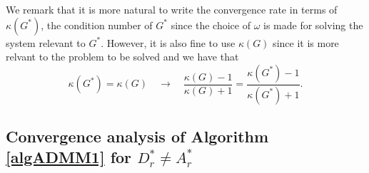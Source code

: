 \begin{remark}
We remark that it is more natural to write the convergence rate in terms of $\kappa(G^*)$, the condition number of $G^*$ since the choice of $\omega$ is made for solving the system relevant to $G^*$. However, it is also fine to use $\kappa(G)$ since it is more relvant to the problem to be solved and we have that
\begin{equation}
\kappa(G^*) = \kappa(G) \quad \rightarrow \quad 
\frac{\kappa(G) - 1}{\kappa(G) + 1} = \frac{\kappa(G^*) - 1}{\kappa(G^*) + 1}. 
\end{equation}
\end{remark} 

\subsection{Convergence analysis of Algorithm \ref{algADMM1} for $D_r^* \neq A_r^*$}\label{gdn} 

